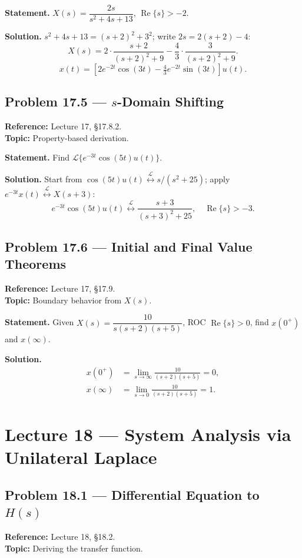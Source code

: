 \documentclass[11pt]{article}
\newcommand{\Lap}{\overset{\mathcal{L}}{\longleftrightarrow}}
\begin{document}
\textbf{Statement.} $X(s) = \dfrac{2s}{s^2+4s+13}$, $\operatorname{Re}\{s\}>-2$.

\textbf{Solution.} $s^2+4s+13 = (s+2)^2+3^2$; write $2s = 2(s+2)-4$:
\[
X(s) = 2\cdot\frac{s+2}{(s+2)^2+9} - \frac{4}{3}\cdot\frac{3}{(s+2)^2+9}.
\]
\[
\boxed{x(t) = \left[2e^{-2t}\cos(3t)-\tfrac{4}{3}e^{-2t}\sin(3t)\right]u(t)}.
\]

\subsection{Problem 17.5 --- $s$-Domain Shifting}
\textbf{Reference:} Lecture 17, \S 17.8.2.\\
\textbf{Topic:} Property-based derivation.

\textbf{Statement.} Find $\mathcal{L}\{e^{-3t}\cos(5t)u(t)\}$.

\textbf{Solution.} Start from $\cos(5t)u(t)\Lap s/(s^2+25)$; apply $e^{-3t}x(t)\Lap X(s+3)$:
\[
e^{-3t}\cos(5t)u(t)\Lap \frac{s+3}{(s+3)^2+25},\quad \operatorname{Re}\{s\}>-3.
\]

\subsection{Problem 17.6 --- Initial and Final Value Theorems}
\textbf{Reference:} Lecture 17, \S 17.9.\\
\textbf{Topic:} Boundary behavior from $X(s)$.

\textbf{Statement.} Given $X(s) = \dfrac{10}{s(s+2)(s+5)}$, ROC $\operatorname{Re}\{s\}>0$, find $x(0^+)$ and $x(\infty)$.

\textbf{Solution.}
\begin{align*}
x(0^+) &= \lim_{s\to\infty}\frac{10}{(s+2)(s+5)} = 0,\\
x(\infty) &= \lim_{s\to 0}\frac{10}{(s+2)(s+5)} = 1.
\end{align*}

\section{Lecture 18 --- System Analysis via Unilateral Laplace}

\subsection{Problem 18.1 --- Differential Equation to $H(s)$}
\textbf{Reference:} Lecture 18, \S 18.2.\\
\textbf{Topic:} Deriving the transfer function.
\end{document}
